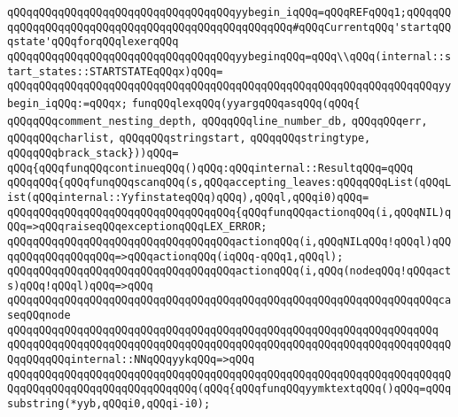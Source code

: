 \verb|qQQqqQQqqQQqqQQqqQQqqQQqqQQqqQQqqQQqyybegin_iqQQq=qQQqREFqQQq1;qQQqqQQqqQQqqQQqqQQqqQQqqQQqqQQqqQQqqQQqqQQqqQQqqQQq#qQQqCurrentqQQq'startqQQqstate'qQQqforqQQqlexerqQQq|\newline
\newline
\verb|qQQqqQQqqQQqqQQqqQQqqQQqqQQqqQQqqQQqyybeginqQQq=qQQq\\qQQq(internal::start_states::STARTSTATEqQQqx)qQQq=|\newline
\verb|qQQqqQQqqQQqqQQqqQQqqQQqqQQqqQQqqQQqqQQqqQQqqQQqqQQqqQQqqQQqqQQqqQQqyybegin_iqQQq:=qQQqx;|\newline
\newline
\verb|funqQQqlexqQQq(yyargqQQqasqQQq(qQQq{|\newline
\verb|qQQqqQQqcomment_nesting_depth,|\newline
\verb|qQQqqQQqline_number_db,|\newline
\verb|qQQqqQQqerr,|\newline
\verb|qQQqqQQqcharlist,|\newline
\verb|qQQqqQQqstringstart,|\newline
\verb|qQQqqQQqstringtype,|\newline
\verb|qQQqqQQqbrack_stack}))qQQq=|\newline
\verb|qQQq{qQQqfunqQQqcontinueqQQq()qQQq:qQQqinternal::ResultqQQq=qQQq|\newline
\verb|qQQqqQQq{qQQqfunqQQqscanqQQq(s,qQQqaccepting_leaves:qQQqqQQqList(qQQqList(qQQqinternal::YyfinstateqQQq)qQQq),qQQql,qQQqi0)qQQq=|\newline
\verb|qQQqqQQqqQQqqQQqqQQqqQQqqQQqqQQqqQQq{qQQqfunqQQqactionqQQq(i,qQQqNIL)qQQq=>qQQqraiseqQQqexceptionqQQqLEX_ERROR;|\newline
\verb|qQQqqQQqqQQqqQQqqQQqqQQqqQQqqQQqqQQqactionqQQq(i,qQQqNILqQQq!qQQql)qQQqqQQqqQQqqQQqqQQq=>qQQqactionqQQq(iqQQq-qQQq1,qQQql);|\newline
\verb|qQQqqQQqqQQqqQQqqQQqqQQqqQQqqQQqqQQqactionqQQq(i,qQQq(nodeqQQq!qQQqacts)qQQq!qQQql)qQQq=>qQQq|\newline
\verb|qQQqqQQqqQQqqQQqqQQqqQQqqQQqqQQqqQQqqQQqqQQqqQQqqQQqqQQqqQQqqQQqqQQqcaseqQQqnode|\newline
\verb|qQQqqQQqqQQqqQQqqQQqqQQqqQQqqQQqqQQqqQQqqQQqqQQqqQQqqQQqqQQqqQQqqQQq|\newline
\verb|qQQqqQQqqQQqqQQqqQQqqQQqqQQqqQQqqQQqqQQqqQQqqQQqqQQqqQQqqQQqqQQqqQQqqQQqqQQqqQQqinternal::NNqQQqyykqQQq=>qQQq|\newline
\verb|qQQqqQQqqQQqqQQqqQQqqQQqqQQqqQQqqQQqqQQqqQQqqQQqqQQqqQQqqQQqqQQqqQQqqQQqqQQqqQQqqQQqqQQqqQQqqQQqqQQq(qQQq{qQQqfunqQQqyymktextqQQq()qQQq=qQQqsubstring(*yyb,qQQqi0,qQQqi-i0);|\newline

